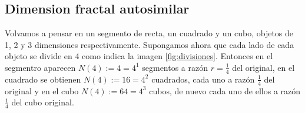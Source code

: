 \subsection{Dimension fractal autosimilar}
\label{subsection:dim-frac-autosimilar}

Volvamos a pensar en un segmento de recta, un cuadrado y un cubo, objetos de 1, 2 y 3 dimensiones respectivamente. Supongamos ahora que cada lado de cada objeto se divide en 4 como indica la imagen \ref{fig:divisiones}. Entonces en el segmentro aparecen $N(4):=4=4^1$ segmentos a razón $r=\frac 1 4$ del original, en el cuadrado se obtienen $N(4):=16=4^2$ cuadrados, cada uno a razón $\frac 1 4$ del original y en el cubo $N(4):=64=4^3$ cubos, de nuevo cada uno de ellos a razón $\frac 1 4$ del cubo original.

\begin{figure}[h]
\begin{tabular}{ccc}

\end{tabular}
\end{figure}
